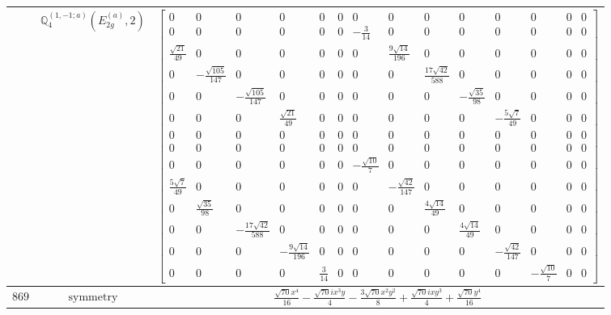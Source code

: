\documentclass[fleqn,8pt,landscape]{jsarticle}
\begin{document}
\begin{longtable}{ccc}
$  $ & $ \mathbb{Q}_{4}^{(1,-1;a)}(E_{2g}^{(a)},2) $ & $ \begin{bmatrix} 0 & 0 & 0 & 0 & 0 & 0 & 0 & 0 & 0 & 0 & 0 & 0 & 0 & 0 \\ 0 & 0 & 0 & 0 & 0 & 0 & - \frac{3}{14} & 0 & 0 & 0 & 0 & 0 & 0 & 0 \\ \frac{\sqrt{21}}{49} & 0 & 0 & 0 & 0 & 0 & 0 & \frac{9 \sqrt{14}}{196} & 0 & 0 & 0 & 0 & 0 & 0 \\ 0 & - \frac{\sqrt{105}}{147} & 0 & 0 & 0 & 0 & 0 & 0 & \frac{17 \sqrt{42}}{588} & 0 & 0 & 0 & 0 & 0 \\ 0 & 0 & - \frac{\sqrt{105}}{147} & 0 & 0 & 0 & 0 & 0 & 0 & - \frac{\sqrt{35}}{98} & 0 & 0 & 0 & 0 \\ 0 & 0 & 0 & \frac{\sqrt{21}}{49} & 0 & 0 & 0 & 0 & 0 & 0 & - \frac{5 \sqrt{7}}{49} & 0 & 0 & 0 \\ 0 & 0 & 0 & 0 & 0 & 0 & 0 & 0 & 0 & 0 & 0 & 0 & 0 & 0 \\ 0 & 0 & 0 & 0 & 0 & 0 & 0 & 0 & 0 & 0 & 0 & 0 & 0 & 0 \\ 0 & 0 & 0 & 0 & 0 & 0 & - \frac{\sqrt{10}}{7} & 0 & 0 & 0 & 0 & 0 & 0 & 0 \\ \frac{5 \sqrt{7}}{49} & 0 & 0 & 0 & 0 & 0 & 0 & - \frac{\sqrt{42}}{147} & 0 & 0 & 0 & 0 & 0 & 0 \\ 0 & \frac{\sqrt{35}}{98} & 0 & 0 & 0 & 0 & 0 & 0 & \frac{4 \sqrt{14}}{49} & 0 & 0 & 0 & 0 & 0 \\ 0 & 0 & - \frac{17 \sqrt{42}}{588} & 0 & 0 & 0 & 0 & 0 & 0 & \frac{4 \sqrt{14}}{49} & 0 & 0 & 0 & 0 \\ 0 & 0 & 0 & - \frac{9 \sqrt{14}}{196} & 0 & 0 & 0 & 0 & 0 & 0 & - \frac{\sqrt{42}}{147} & 0 & 0 & 0 \\ 0 & 0 & 0 & 0 & \frac{3}{14} & 0 & 0 & 0 & 0 & 0 & 0 & - \frac{\sqrt{10}}{7} & 0 & 0 \end{bmatrix} $ \\ \hline
$ 869 $ & $ \text{symmetry} $ & $ \frac{\sqrt{70} x^{4}}{16} - \frac{\sqrt{70} i x^{3} y}{4} - \frac{3 \sqrt{70} x^{2} y^{2}}{8} + \frac{\sqrt{70} i x y^{3}}{4} + \frac{\sqrt{70} y^{4}}{16} $ \\

\end{longtable}
\end{document}
